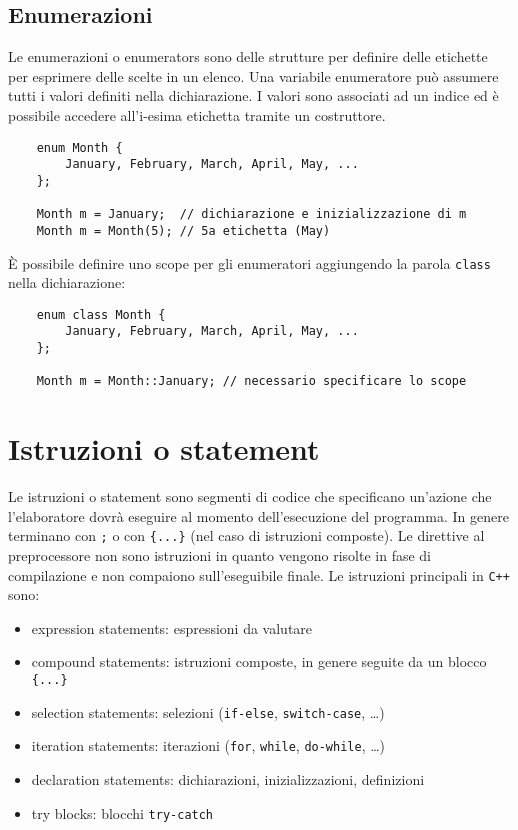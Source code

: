 \documentclass[a4paper]{article}
\begin{document}
\subsection{Enumerazioni}
Le enumerazioni o enumerators sono delle strutture per definire delle etichette per esprimere delle scelte in un elenco. Una
variabile enumeratore può assumere tutti i valori definiti nella dichiarazione. I valori sono associati ad un indice ed è
possibile accedere all'i-esima etichetta tramite un costruttore.
\begin{lstlisting}
	enum Month {
		January, February, March, April, May, ...
	};

	Month m = January;  // dichiarazione e inizializzazione di m
	Month m = Month(5); // 5a etichetta (May)
\end{lstlisting}
È possibile definire uno scope per gli enumeratori aggiungendo la parola \verb|class| nella dichiarazione:
\begin{lstlisting}
	enum class Month {
		January, February, March, April, May, ...
	};

	Month m = Month::January; // necessario specificare lo scope
\end{lstlisting}

\newpage

\section{Istruzioni o statement}
Le istruzioni o statement sono segmenti di codice che specificano un'azione che l'elaboratore dovrà eseguire al momento
dell'esecuzione del programma. In genere terminano con \verb|;| o con \verb|{...}| (nel caso di istruzioni composte).
Le direttive al preprocessore non sono istruzioni in quanto vengono risolte in fase di compilazione e non compaiono
sull'eseguibile finale. Le istruzioni principali in \verb|C++| sono:
\begin{itemize}
	\item expression statements: espressioni da valutare
	\item compound statements: istruzioni composte, in genere seguite da un blocco \verb|{...}|
	\item selection statements: selezioni (\verb|if-else|, \verb|switch-case|, \dots)
	\item iteration statements: iterazioni (\verb|for|, \verb|while|, \verb|do-while|, \dots)
	\item declaration statements: dichiarazioni, inizializzazioni, definizioni
	\item try blocks: blocchi \verb|try-catch|
\end{itemize}
\end{document}
